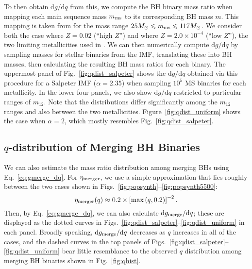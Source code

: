 \documentclass[
        fleqn,
        usenatbib,
    ]{mnras}
\newcommand*{\rdil}[2]{\mathrm{d}#1/\mathrm{d}#2}
\newcommand*{\p}[1]{\left(#1\right)}
\newcommand*{\s}[1]{\left[#1\right]}
\begin{document}
To then obtain $\rdil{g}{q}$ from this, we compute the BH binary mass ratio
when mapping each main sequence mass $m_{\rm ms}$ to its corresponding BH mass
$m$. This mapping is taken from \citet{spera2017very} for the mass range
$25M_{\odot} \leq m_{\rm ms} \leq 117 M_{\odot}$. We consider both the case
where $Z = 0.02$ (``high $Z$'') and where $Z = 2.0 \times 10^{-4}$ (``low
$Z$''), the two limiting metallicities used in \citet{spera2017very}.
We can then numerically compute $\rdil{g}{q}$ by sampling masses for stellar
binaries from the IMF, translating these into BH masses, then calculating the
resulting BH mass ratios for each binary. The uppermost panel of
Fig.~\ref{fig:qdist_salpeter} shows the $\rdil{g}{q}$ obtained via this
procedure for a Salpeter IMF ($\alpha = 2.35$) when sampling $10^5$ MS binaries
for each metallicity. In the lower four panels, we also show $\rdil{g}{q}$
restricted to particular ranges of $m_{12}$. Note that the distributions differ
significantly among the $m_{12}$ ranges and also between the two metallicities.
Figure~\ref{fig:qdist_uniform} shows the case when $\alpha = 2$, which mostly
resembles Fig.~\ref{fig:qdist_salpeter}.

\subsection{$q$-distribution of Merging BH Binaries}\label{ss:qdist_merge}

We can also estimate the mass ratio distribution among merging BHs using
Eq.~\eqref{eq:gmerge_dq}. For $\eta_{\rm merger}$, we use a simple approximation
that lies roughly between the two cases shown in
Figs.~\ref{fig:popsynth}--\ref{fig:popsynth5500}:
\begin{equation}
    \eta_{\rm merger}(q) \approx 0.2 \times \s{\max\p{q, 0.2}}^{-2}.
        \label{eq:etam_approx}
\end{equation}
Then, by Eq.~\eqref{eq:gmerge_dq}, we can also calculate $\rdil{g_{\rm
merge}}{q}$; these are displayed as the dotted curves in
Figs.~\ref{fig:qdist_salpeter}--\ref{fig:qdist_uniform} in each panel. Broadly
speaking, $\rdil{g_{\rm merge}}{q}$ decreases as $q$ increases in all of the
cases, and the dashed curves in the top panels of
Figs.~\ref{fig:qdist_salpeter}--\ref{fig:qdist_uniform} bear little resemblance
to the observed $q$ distribution among merging BH binaries shown in
Fig.~\ref{fig:qhist}.
\end{document}
